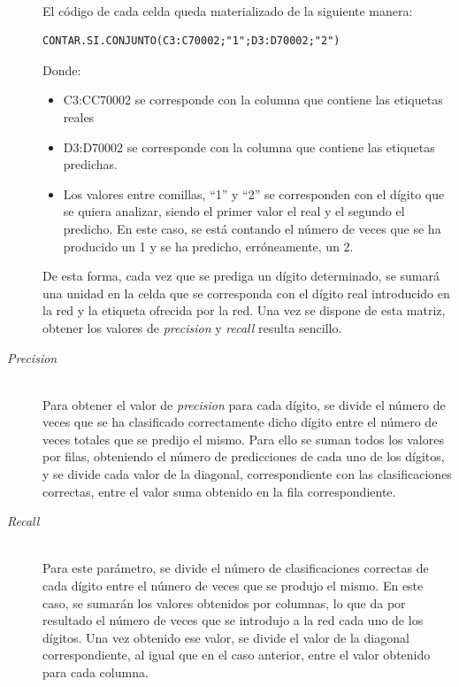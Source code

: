 \begin{description}
	\vspace{-10pt}
	\\
	El código de cada celda queda materializado de la siguiente manera:
	\vspace{10pt}
	\begin{lstlisting}[frame=single]
	CONTAR.SI.CONJUNTO(C3:C70002;"1";D3:D70002;"2")
	\end{lstlisting}
	Donde:
	\begin{itemize}
		\item C3:CC70002 se corresponde con la columna que contiene las etiquetas reales
		\item D3:D70002 se corresponde con la columna que contiene las etiquetas predichas.
		\item Los valores entre comillas, ``1'' y ``2'' se corresponden con el dígito que se quiera analizar, siendo el primer valor el real y el segundo el predicho. En este caso, se está contando el número de veces que se ha producido un 1 y se ha predicho, erróneamente, un 2.
	\end{itemize}
	
	De esta forma, cada vez que se prediga un dígito determinado, se sumará una unidad en la celda que se corresponda con el dígito real introducido en la red y la etiqueta ofrecida por la red. Una vez se dispone de esta matriz, obtener los valores de \textit{precision} y \textit{recall} resulta sencillo.
	\vspace{5pt}
	\item[\textit{Precision}] \hfill 
	\vspace{5pt}
	\\
	Para obtener el valor de \textit{precision} para cada dígito, se divide el número de veces que se ha clasificado correctamente dicho dígito entre el número de veces totales que se predijo el mismo. Para ello se suman todos los valores por filas, obteniendo el número de predicciones de cada uno de los dígitos, y se divide cada valor de la diagonal, correspondiente con las clasificaciones correctas, entre el valor suma obtenido en la fila correspondiente.
	\vspace{5pt}
	\item[\textit{Recall}] \hfill 
	\vspace{5pt}
	\\
	Para este parámetro, se divide el número de clasificaciones correctas de cada dígito entre el número de veces que se produjo el mismo. En este caso, se sumarán los valores obtenidos por columnas, lo que da por resultado el número de veces que se introdujo a la red cada uno de los dígitos. Una vez obtenido ese valor, se divide el valor de la diagonal correspondiente, al igual que en el caso anterior, entre el valor obtenido para cada columna.
\end{description}
\vspace{10pt}
